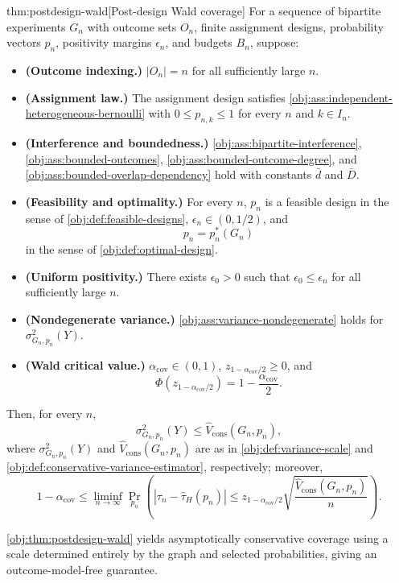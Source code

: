 \begin{theoremv}{thm:postdesign-wald}[Post-design Wald coverage]
For a sequence of bipartite experiments $G_n$ with outcome sets $O_n$, finite assignment designs, probability vectors $p_n$, positivity margins $\epsilon_n$, and budgets $B_n$, suppose:
\begin{itemize}
\item \textbf{(Outcome indexing.)} $|O_n|=n$ for all sufficiently large $n$.
\item \textbf{(Assignment law.)} The assignment design satisfies \cref{obj:ass:independent-heterogeneous-bernoulli} with $0\le p_{n,k}\le 1$ for every $n$ and $k\in I_n$.
\item \textbf{(Interference and boundedness.)} \cref{obj:ass:bipartite-interference}, \cref{obj:ass:bounded-outcomes}, \cref{obj:ass:bounded-outcome-degree}, and \cref{obj:ass:bounded-overlap-dependency} hold with constants $\bar d$ and $\bar D$.
\item \textbf{(Feasibility and optimality.)} For every $n$, $p_n$ is a feasible design in the sense of \cref{obj:def:feasible-designs}, $\epsilon_n\in(0,1/2)$, and
\[
p_n=p_n^*(G_n)
\]
in the sense of \cref{obj:def:optimal-design}.
\item \textbf{(Uniform positivity.)} There exists $\epsilon_0>0$ such that $\epsilon_0\le\epsilon_n$ for all sufficiently large $n$.
\item \textbf{(Nondegenerate variance.)} \cref{obj:ass:variance-nondegenerate} holds for $\sigma^2_{G_n,p_n}(Y)$.
\item \textbf{(Wald critical value.)} $\alpha_{\mathrm{cov}}\in(0,1)$, $z_{1-\alpha_{\mathrm{cov}}/2}\ge0$, and
\[
\Phi\!\left(z_{1-\alpha_{\mathrm{cov}}/2}\right)
=1-\frac{\alpha_{\mathrm{cov}}}{2}.
\]
\end{itemize}
Then, for every $n$,
\[
\sigma^2_{G_n,p_n}(Y)\le \widehat V_{\mathrm{cons}}(G_n,p_n),
\]
where $\sigma^2_{G_n,p_n}(Y)$ and $\widehat V_{\mathrm{cons}}(G_n,p_n)$ are as in \cref{obj:def:variance-scale} and \cref{obj:def:conservative-variance-estimator}, respectively; moreover,
\[
1-\alpha_{\mathrm{cov}}
\le
\liminf_{n\to\infty}
\Pr_{p_n}\!\left(
\left|\tau_n-\widehat\tau_H(p_n)\right|
\le
z_{1-\alpha_{\mathrm{cov}}/2}
\sqrt{\frac{\widehat V_{\mathrm{cons}}(G_n,p_n)}{n}}
\right).
\]
\end{theoremv}

\cref{obj:thm:postdesign-wald} yields asymptotically conservative coverage using a scale determined entirely by the graph and selected probabilities, giving an outcome-model-free guarantee.

